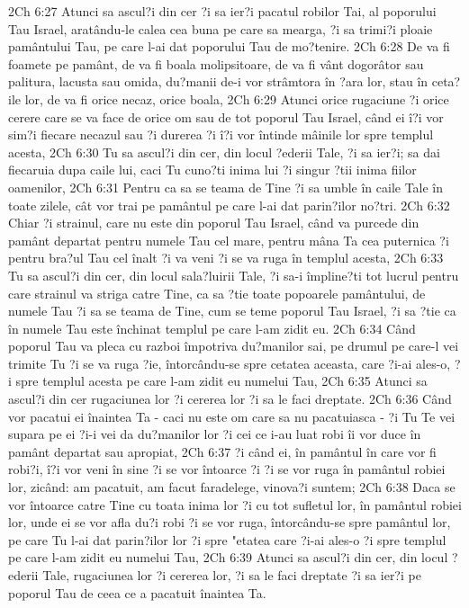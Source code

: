 2Ch 6:27  Atunci sa ascul?i din cer ?i sa ier?i pacatul robilor Tai, al poporului Tau Israel, aratându-le calea cea buna pe care sa mearga, ?i sa trimi?i ploaie pamântului Tau, pe care l-ai dat poporului Tau de mo?tenire.
2Ch 6:28  De va fi foamete pe pamânt, de va fi boala molipsitoare, de va fi vânt dogorâtor sau palitura, lacusta sau omida, du?manii de-i vor strâmtora în ?ara lor, stau în ceta?ile lor, de va fi orice necaz, orice boala,
2Ch 6:29  Atunci orice rugaciune ?i orice cerere care se va face de orice om sau de tot poporul Tau Israel, când ei î?i vor sim?i fiecare necazul sau ?i durerea ?i î?i vor întinde mâinile lor spre templul acesta,
2Ch 6:30  Tu sa ascul?i din cer, din locul ?ederii Tale, ?i sa ier?i; sa dai fiecaruia dupa caile lui, caci Tu cuno?ti inima lui ?i singur ?tii inima fiilor oamenilor,
2Ch 6:31  Pentru ca sa se teama de Tine ?i sa umble în caile Tale în toate zilele, cât vor trai pe pamântul pe care l-ai dat parin?ilor no?tri.
2Ch 6:32  Chiar ?i strainul, care nu este din poporul Tau Israel, când va purcede din pamânt departat pentru numele Tau cel mare, pentru mâna Ta cea puternica ?i pentru bra?ul Tau cel înalt ?i va veni ?i se va ruga în templul acesta,
2Ch 6:33  Tu sa ascul?i din cer, din locul sala?luirii Tale, ?i sa-i împline?ti tot lucrul pentru care strainul va striga catre Tine, ca sa ?tie toate popoarele pamântului, de numele Tau ?i sa se teama de Tine, cum se teme poporul Tau Israel, ?i sa ?tie ca în numele Tau este închinat templul pe care l-am zidit eu.
2Ch 6:34  Când poporul Tau va pleca cu razboi împotriva du?manilor sai, pe drumul pe care-l vei trimite Tu ?i se va ruga ?ie, întorcându-se spre cetatea aceasta, care ?i-ai ales-o, ?i spre templul acesta pe care l-am zidit eu numelui Tau,
2Ch 6:35  Atunci sa ascul?i din cer rugaciunea lor ?i cererea lor ?i sa le faci dreptate.
2Ch 6:36  Când vor pacatui ei înaintea Ta - caci nu este om care sa nu pacatuiasca - ?i Tu Te vei supara pe ei ?i-i vei da du?manilor lor ?i cei ce i-au luat robi îi vor duce în pamânt departat sau apropiat,
2Ch 6:37  ?i când ei, în pamântul în care vor fi robi?i, î?i vor veni în sine ?i se vor întoarce ?i ?i se vor ruga în pamântul robiei lor, zicând: am pacatuit, am facut faradelege, vinova?i suntem;
2Ch 6:38  Daca se vor întoarce catre Tine cu toata inima lor ?i cu tot sufletul lor, în pamântul robiei lor, unde ei se vor afla du?i robi ?i se vor ruga, întorcându-se spre pamântul lor, pe care Tu l-ai dat parin?ilor lor ?i spre "etatea care ?i-ai ales-o ?i spre templul pe care l-am zidit eu numelui Tau,
2Ch 6:39  Atunci sa ascul?i din cer, din locul ?ederii Tale, rugaciunea lor ?i cererea lor, ?i sa le faci dreptate ?i sa ier?i pe poporul Tau de ceea ce a pacatuit înaintea Ta.

